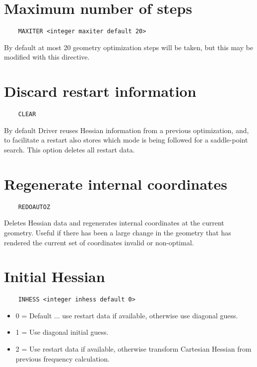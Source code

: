 \section{Maximum number of steps}

\begin{verbatim}
    MAXITER <integer maxiter default 20>
\end{verbatim}

By default at most 20 geometry optimization steps will be taken,
but this may be modified with this directive.

\section{Discard restart information}
\begin{verbatim}
    CLEAR
\end{verbatim}

By default Driver reuses Hessian information from a previous
optimization, and, to facilitate a restart also stores which mode is
being followed for a saddle-point search.  This option deletes all
restart data.

\section{Regenerate internal coordinates}

\begin{verbatim}
    REDOAUTOZ
\end{verbatim}

Deletes Hessian data and regenerates internal coordinates at the
current geometry.  Useful if there has been a large change in the
geometry that has rendered the current set of coordinates invalid or
non-optimal.

\section{Initial Hessian}
\begin{verbatim}
    INHESS <integer inhess default 0>
\end{verbatim}

\begin{itemize}
\item  0 = Default ... use restart data if available, otherwise use diagonal guess.
\item  1 = Use diagonal initial guess.
\item  2 = Use restart data if available, otherwise transform
Cartesian Hessian from previous frequency calculation.
\end{itemize}


